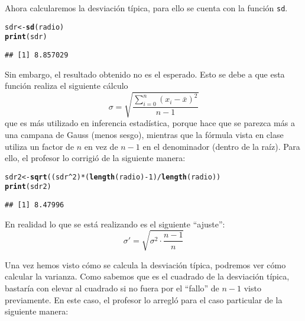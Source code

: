 \documentclass[12pt]{report}\usepackage[]{graphicx}\usepackage[dvipsnames]{xcolor}
\makeatletter
\newcommand{\hlnum}[1]{\textcolor[rgb]{0.686,0.059,0.569}{#1}}%
\newcommand{\hlopt}[1]{\textcolor[rgb]{0,0,0}{#1}}%
\newcommand{\hlstd}[1]{\textcolor[rgb]{0.345,0.345,0.345}{#1}}%
\newcommand{\hlkwb}[1]{\textcolor[rgb]{0.69,0.353,0.396}{#1}}%
\newcommand{\hlkwd}[1]{\textcolor[rgb]{0.737,0.353,0.396}{\textbf{#1}}}%
\newenvironment{kframe}{%
 \def\at@end@of@kframe{}%
 \ifinner\ifhmode%
  \def\at@end@of@kframe{\end{minipage}}%
  \begin{minipage}{\columnwidth}%
 \fi\fi%
 \def\FrameCommand##1{\hskip\@totalleftmargin \hskip-\fboxsep
 \colorbox{shadecolor}{##1}\hskip-\fboxsep
     \hskip-\linewidth \hskip-\@totalleftmargin \hskip\columnwidth}%
 \MakeFramed {\advance\hsize-\width
   \@totalleftmargin\z@ \linewidth\hsize
   \@setminipage}}%
 {\par\unskip\endMakeFramed%
 \at@end@of@kframe}
\newenvironment{knitrout}{}{} %
\makeatother
\begin{document}
			Ahora calcularemos la desviación típica, para ello se cuenta con la función \texttt{sd}. 
			
\begin{knitrout}
\color{fgcolor}\begin{kframe}
\begin{alltt}
\hlstd{sdr} \hlkwb{<-} \hlkwd{sd}\hlstd{(radio)}
\hlkwd{print}\hlstd{(sdr)}
\end{alltt}
\begin{verbatim}
## [1] 8.857029
\end{verbatim}
\end{kframe}
\end{knitrout}
			
			Sin embargo, el resultado obtenido no es el esperado. Esto se debe a que esta función realiza el siguiente cálculo
			$$
			\sigma = \sqrt{\frac{\displaystyle\sum_{i=0}^n (x_i-\bar{x})^2}{n-1}}
			$$
			que es más utilizado en inferencia estadística, porque hace que se parezca más a una campana de Gauss (menos sesgo), mientras que la fórmula vista en clase utiliza un factor de $n$ en vez de $n-1$ en el denominador (dentro de la raíz). Para ello, el profesor lo corrigió de la siguiente manera: 
			
\begin{knitrout}
\color{fgcolor}\begin{kframe}
\begin{alltt}
\hlstd{sdr2} \hlkwb{<-} \hlkwd{sqrt}\hlstd{((sdr}\hlopt{^}\hlnum{2}\hlstd{)}\hlopt{*}\hlstd{(}\hlkwd{length}\hlstd{(radio)}\hlopt{-}\hlnum{1}\hlstd{)}\hlopt{/}\hlkwd{length}\hlstd{(radio))}
\hlkwd{print}\hlstd{(sdr2)}
\end{alltt}
\begin{verbatim}
## [1] 8.47996
\end{verbatim}
\end{kframe}
\end{knitrout}
			
			En realidad lo que se está realizando es el siguiente ``ajuste'': 
			$$
			\sigma' = \sqrt{\sigma^2\cdot\frac{n-1}{n}}
			$$
			
			Una vez hemos visto cómo se calcula la desviación típica, podremos ver cómo calcular la varianza. Como sabemos que es el cuadrado de la desviación típica, bastaría con elevar al cuadrado si no fuera por el ``fallo'' de $n-1$ visto previamente. En este caso, el profesor lo arregló para el caso particular de la siguiente manera: 
			
\end{document}
